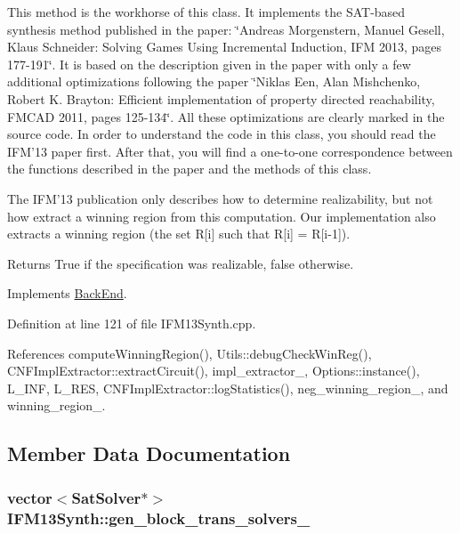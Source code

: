 This method is the workhorse of this class. It implements the S\-A\-T-\/based synthesis method published in the paper\-: \char`\"{}\-Andreas Morgenstern, Manuel Gesell, Klaus Schneider\-: Solving
\-Games Using Incremental Induction, I\-F\-M 2013, pages 177-\/191\char`\"{}. It is based on the description given in the paper with only a few additional optimizations following the paper \char`\"{}\-Niklas Een, Alan Mishchenko, Robert K. Brayton\-: Efficient implementation of
property directed reachability, F\-M\-C\-A\-D 2011, pages 125-\/134\char`\"{}. All these optimizations are clearly marked in the source code. In order to understand the code in this class, you should read the I\-F\-M'13 paper first. After that, you will find a one-\/to-\/one correspondence between the functions described in the paper and the methods of this class.

The I\-F\-M'13 publication only describes how to determine realizability, but not how extract a winning region from this computation. Our implementation also extracts a winning region (the set R\mbox{[}i\mbox{]} such that R\mbox{[}i\mbox{]} = R\mbox{[}i-\/1\mbox{]}).

\begin{DoxyReturn}{Returns}
True if the specification was realizable, false otherwise. 
\end{DoxyReturn}


Implements \hyperlink{classBackEnd_a099e717dc71e9cc2d838b1ca86340590}{Back\-End}.



Definition at line 121 of file I\-F\-M13\-Synth.\-cpp.



References compute\-Winning\-Region(), Utils\-::debug\-Check\-Win\-Reg(), C\-N\-F\-Impl\-Extractor\-::extract\-Circuit(), impl\-\_\-extractor\-\_\-, Options\-::instance(), L\-\_\-\-I\-N\-F, L\-\_\-\-R\-E\-S, C\-N\-F\-Impl\-Extractor\-::log\-Statistics(), neg\-\_\-winning\-\_\-region\-\_\-, and winning\-\_\-region\-\_\-.



\subsection{Member Data Documentation}
\hypertarget{classIFM13Synth_a950a68d4f0efeca411ead2d4439aed9d}{
\subsubsection[{gen\-\_\-block\-\_\-trans\-\_\-solvers\-\_\-}]{\setlength{\rightskip}{0pt plus 5cm}vector$<${\bf Sat\-Solver}$\ast$$>$ I\-F\-M13\-Synth\-::gen\-\_\-block\-\_\-trans\-\_\-solvers\-\_\-\hspace{0.3cm}{\ttfamily [protected]}}}\label{classIFM13Synth_a950a68d4f0efeca411ead2d4439aed9d}


